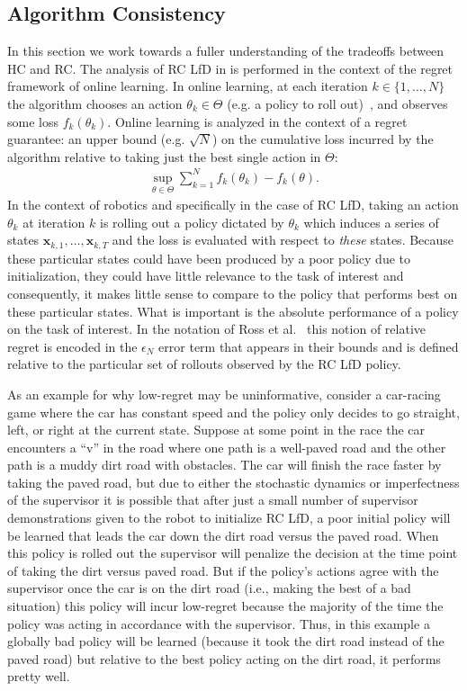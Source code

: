 \documentclass[10pt, conference]{ieeeconf}      %
\newcommand{\bx}{\mathbf{x}}
\begin{document}
\subsection{Algorithm Consistency}\label{sec:consistent}
In this section we work towards a fuller understanding of the tradeoffs between HC and RC. The analysis of RC LfD in \cite{ross2010reduction} is performed in the context of the regret framework of online learning. 
In online learning, at each iteration $k \in \{1,\dots,N\}$ the algorithm chooses an action $\theta_k \in \Theta$ (e.g. a policy to roll out)~\cite{shalev2009mind}, and observes some loss $f_k(\theta_k)$. 
Online learning is analyzed in the context of a regret guarantee: an upper bound (e.g. $\sqrt{N}$) on the cumulative loss incurred by the algorithm relative to taking just the best single action in $\Theta$:
\begin{align*}
\sup_{\theta \in \Theta} \sum_{k=1}^N f_k(\theta_k) - f_k(\theta).
\end{align*}
In the context of robotics and specifically in the case of RC LfD, taking an action $\theta_k$ at iteration $k$ is rolling out a policy dictated by $\theta_k$ which induces a series of states $\bx_{k,1},\dots,\bx_{k,T}$ and the loss is evaluated with respect to {\em these} states.  
Because these particular states could have been produced by a poor policy due to initialization, they could have little relevance to the task of interest and consequently, it makes little sense to compare to the policy that performs best on these particular states.
What is important is the absolute performance of a policy on the task of interest. 
In the notation of Ross et al.~\cite{ross2010reduction} this notion of relative regret is encoded in the $\epsilon_N$ error term that appears in their bounds and is defined relative to the particular set of rollouts observed by the RC LfD policy.

As an example for why low-regret may be uninformative, consider a car-racing game where the car has constant speed and the policy only decides to go straight, left, or right at the current state. 
Suppose at some point in the race the car encounters a ``v'' in the road where one path is a well-paved road and the other path is a muddy dirt road with obstacles. 
The car will finish the race faster by taking the paved road, but due to either the stochastic dynamics or imperfectness of the supervisor it is possible that after just a small number of supervisor demonstrations given to the robot to initialize RC LfD, a poor initial policy will be learned that leads the car down the dirt road versus the paved road. 
When this policy is rolled out the supervisor will penalize the decision at the time point of taking the dirt versus paved road. 
But if the policy's actions agree with the supervisor once the car is on the dirt road (i.e., making the best of a bad situation) this policy will incur low-regret because the majority of the time the policy was acting in accordance with the supervisor.
Thus, in this example a globally bad policy will be learned (because it took the dirt road instead of the paved road) but relative to the best policy acting on the dirt road, it performs pretty well. 
\end{document}
